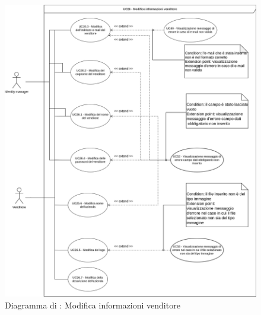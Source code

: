 \label{modifica-informazioni-venditore}

\begin{figure}[H]
    \centering
    \includegraphics[scale=0.6]{Immagini/DiagrammiUC/Venditore/ModificaInformazioniVenditore.png}
    \caption{Diagramma di \actualUC: Modifica informazioni venditore}
    \label{fig:modifica-informazioni-venditore}
\end{figure}

